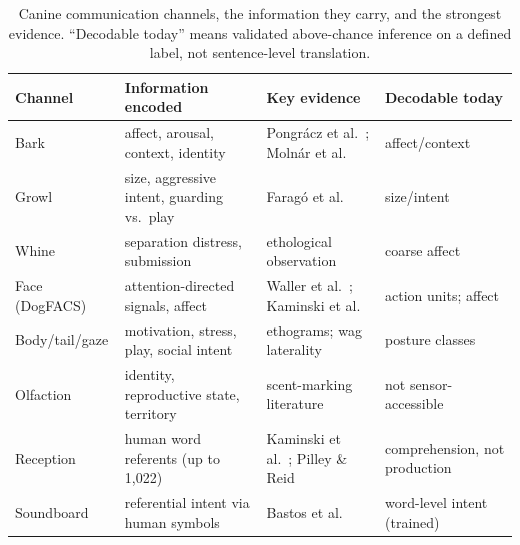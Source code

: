 \begin{table}[htbp]
\centering
\caption{Canine communication channels, the information they carry, and the
strongest evidence. ``Decodable today'' means validated above-chance
inference on a defined label, not sentence-level translation.}
\label{tab:channels}
\footnotesize
\setlength{\tabcolsep}{4pt}
\begin{tabular}{@{}p{2.5cm}p{4.1cm}p{4.0cm}p{2.6cm}@{}}
\toprule
\textbf{Channel} & \textbf{Information encoded} & \textbf{Key evidence} & \textbf{Decodable today} \\
\midrule
Bark & affect, arousal, context, identity & Pongr\'acz et al.~\cite{pongracz2005barks,pongracz2006acoustic}; Moln\'ar et al.~\cite{molnar2006discriminate} & affect/context \\
Growl & size, aggressive intent, guarding vs.\ play & Farag\'o et al.~\cite{farago2017growls} & size/intent \\
Whine & separation distress, submission & ethological observation & coarse affect \\
Face (DogFACS) & attention-directed signals, affect & Waller et al.~\cite{waller2013dogfacs}; Kaminski et al.~\cite{kaminski2017attention} & action units; affect \\
Body/tail/gaze & motivation, stress, play, social intent & ethograms; wag laterality~\cite{quaranta2007tail} & posture classes \\
Olfaction & identity, reproductive state, territory & scent-marking literature & not sensor-accessible \\
Reception & human word referents (up to 1{,}022) & Kaminski et al.~\cite{kaminski2004rico}; Pilley \& Reid~\cite{pilley2011chaser} & comprehension, not production \\
Soundboard & referential intent via human symbols & Bastos et al.~\cite{bastos2024plos,bastos2024scirep} & word-level intent (trained) \\
\bottomrule
\end{tabular}
\end{table}

